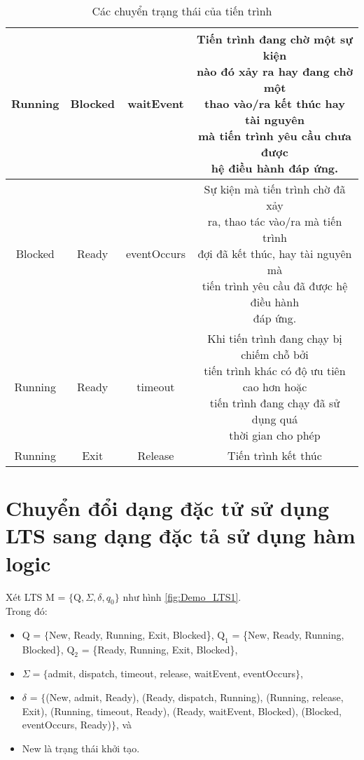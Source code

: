 \documentclass[a4paper,13pt,oneside,openany]{book}
\begin{document}
\begin{flushleft}
\begin{table}[!ht]
\begin{tabular}{|c|c|c|c|}
			\hline
			Running & Blocked & waitEvent & \shortstack{Tiến trình đang chờ một sự kiện\\nào đó xảy ra hay đang chờ một\\thao vào/ra kết thúc hay tài nguyên\\mà tiến trình yêu cầu chưa được\\hệ điều hành đáp ứng.}\\
			\hline
			Blocked & Ready & eventOccurs &\shortstack{Sự kiện mà tiến trình chờ đã xảy\\ ra, thao tác vào/ra mà tiến trình\\đợi đã kết thúc, hay tài nguyên mà\\tiến trình yêu cầu đã được hệ điều hành\\đáp ứng.}\\
			\hline
			Running & Ready & timeout & \shortstack{Khi tiến trình đang chạy bị chiếm chỗ bởi\\
			tiến trình khác có độ ưu tiên cao hơn hoặc\\
			tiến trình đang chạy đã sử dụng quá\\ thời gian cho phép}\\
		    \hline
		    Running & Exit & Release & Tiến trình kết thúc\\
		    \hline
		\end{tabular}
		\caption{Các chuyển trạng thái của tiến trình}
	\end{table}
	\section{Chuyển đổi dạng đặc tử sử dụng LTS sang dạng đặc tả sử dụng hàm logic}
	Xét LTS M = $\{\textrm{Q}, \Sigma, \delta, q_0\}$ như hình \ref{fig:Demo_LTS1}.\\
	Trong đó:
	\begin{itemize}
		\item Q = $\{$New, Ready, Running, Exit, Blocked\}, $\textrm{Q}_1$ = \{New, Ready, Running, Blocked\}, $\textrm{Q}_2$ = \{Ready, Running, Exit, Blocked\},
		\item $\Sigma = \{$admit, dispatch, timeout, release, waitEvent, eventOccurs$\}$,
		\item $\delta$ = $\{$(New, admit, Ready), (Ready, dispatch, Running), (Running, release, Exit), (Running, timeout, Ready), (Ready, waitEvent, Blocked), (Blocked, eventOccurs, Ready)$\}$, và
		\item New là trạng thái khởi tạo.
	\end{itemize}


\end{flushleft}
\end{document}
